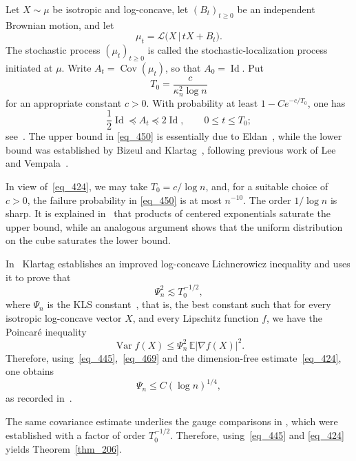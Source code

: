 \documentclass[12pt]{article}
\theoremstyle{definition}
\theoremstyle{remark}
\newcommand{\E}{\mathbb E}
\newcommand{\Var}{\operatorname{Var}}
\newcommand{\Cov}{\operatorname{Cov}}
\newcommand{\Id}{\operatorname{Id}}
\begin{document}
Let $X\sim\mu$ be isotropic and log-concave, let $(B_t)_{t\geq0}$ be an
independent Brownian motion, and let
\[
  \mu_t=\mathcal L\bigl(X\,\big|\,tX+B_t\bigr).
\]
The stochastic process
$(\mu_t)_{t\geq0}$ is called the stochastic-localization process
initiated at $\mu$. Write $A_t=\Cov(\mu_t)$, so that $A_0=\Id$. Put
\begin{equation}\label{eq_445}
  T_0=\frac{c}{\kappa_n^2\log n}
\end{equation}
for an appropriate constant $c>0$. With probability at least
$1-Ce^{-c/T_0}$, one has
\begin{equation}\label{eq_450}
  \frac12\Id\preceq A_t\preceq2\Id,
  \qquad 0\leq t\leq T_0;
\end{equation}
see~\cite[Proposition~2.3]{BizeulKlartag}. The upper bound in
\eqref{eq_450} is essentially due to Eldan~\cite{Eldan},
while the lower bound was established by Bizeul and
Klartag~\cite{BizeulKlartag}, following previous work of Lee and
Vempala~\cite{LeeVempala}.

In view of~\eqref{eq_424}, we may take $T_0=c/\log n$, and, for
a suitable choice of $c>0$, the failure probability in
\eqref{eq_450} is at most $n^{-10}$. The order $1/\log n$ is
sharp. It is explained in~\cite{KlartagLehecSurvey} that products of
centered exponentials saturate the upper bound, while an analogous
argument shows that the uniform distribution on the cube saturates the
lower bound.

In~\cite{KlartagKLS} Klartag establishes an improved log-concave Lichnerowicz inequality and uses it to prove that 
\begin{equation}\label{eq_469}
    \Psi_n^2 \lesssim T_0^{-1/2},
\end{equation}
where $\Psi_n$ is the KLS constant~\cite{KannanLovaszSimonovits}, that is, the best constant such that for every isotropic log-concave vector $X$, and every Lipschitz function $f$, we have the Poincaré inequality
$$\Var f(X) \leq \Psi_n^2 \, \E |\nabla f(X)|^2.$$
Therefore, using~\eqref{eq_445},~\eqref{eq_469} and the
dimension-free estimate~\eqref{eq_424}, one obtains
\begin{equation}\label{eq_476}
  \Psi_n\leq C(\log n)^{1/4},
\end{equation}
as recorded in~\cite{Letwin}.

The same covariance estimate underlies the gauge comparisons in
\cite{EldanLehec,BizeulKlartag}, which were established with a factor of
order $T_0^{-1/2}$. Therefore, using~\eqref{eq_445} and
\eqref{eq_424} yields Theorem~\ref{thm_206}.
\end{document}
